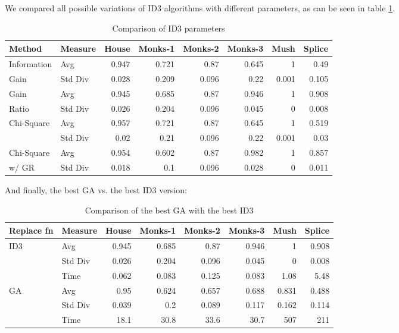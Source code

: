 \documentclass[12pt, letterpaper]{article}
\begin{document}
We compared all possible variations of ID3 algorithms with different parameters, as can be seen in table \ref{tab:id3}.

\begin{table}[htbp]
\caption{Comparison of ID3 parameters}
\begin{tabular}{|l|l|r|r|r|r|r|r|}
\hline
\textbf{Method} & \textbf{Measure} & \multicolumn{1}{l|}{\textbf{House}} & \multicolumn{1}{l|}{\textbf{Monks-1}} & \multicolumn{1}{l|}{\textbf{Monks-2}} & \multicolumn{1}{l|}{\textbf{Monks-3}} & \multicolumn{1}{l|}{\textbf{Mush}} & \multicolumn{1}{l|}{\textbf{Splice}} \\ \hline
Information & Avg & 0.947 & 0.721 & 0.87 & 0.645 & 1 & 0.49 \\ \cline{2-8}
Gain & Std Div & 0.028 & 0.209 & 0.096 & 0.22 & 0.001 & 0.105 \\ \hline
Gain & Avg & 0.945 & 0.685 & 0.87 & 0.946 & 1 & 0.908 \\ \cline{2-8}
Ratio & Std Div & 0.026 & 0.204 & 0.096 & 0.045 & 0 & 0.008 \\ \hline
Chi-Square & Avg & 0.957 & 0.721 & 0.87 & 0.645 & 1 & 0.519 \\ \cline{2-8}
 & Std Div & 0.02 & 0.21 & 0.096 & 0.22 & 0.001 & 0.03 \\ \hline
 Chi-Square & Avg & 0.954 & 0.602 & 0.87 & 0.982 & 1 & 0.857 \\ \cline{2-8}
w/ GR & Std Div & 0.018 & 0.1 & 0.096 & 0.028 & 0 & 0.011 \\ \hline
\end{tabular}
\label{tab:id3}
\end{table}

And finally, the best GA vs. the best ID3 version:

\begin{table}[htbp]
\caption{Comparison of the best GA with the best ID3}
\begin{center}
\begin{tabular}{|l|l|r|r|r|r|r|r|}
\hline
\textbf{Replace fn} & \textbf{Measure} & \multicolumn{1}{l|}{\textbf{House}} & \multicolumn{1}{l|}{\textbf{Monks-1}} & \multicolumn{1}{l|}{\textbf{Monks-2}} & \multicolumn{1}{l|}{\textbf{Monks-3}} & \multicolumn{1}{l|}{\textbf{Mush}} & \multicolumn{1}{l|}{\textbf{Splice}} \\ \hline
ID3 & Avg & 0.945 & 0.685 & 0.87 & 0.946 & 1 & 0.908 \\ \hline
 & Std Div & 0.026 & 0.204 & 0.096 & 0.045 & 0 & 0.008 \\ \hline
 & Time & 0.062 & 0.083 & 0.125 & 0.083 & 1.08 & 5.48 \\ \hline
GA & Avg & 0.95 & 0.624 & 0.657 & 0.688 & 0.831 & 0.488 \\ \hline
 & Std Div & 0.039 & 0.2 & 0.089 & 0.117 & 0.162 & 0.114 \\ \hline
 & Time & 18.1 & 30.8 & 33.6 & 30.7 & 507 & 211 \\ \hline
\end{tabular}
\end{center}
\label{id3ga}
\end{table}
\end{document}
